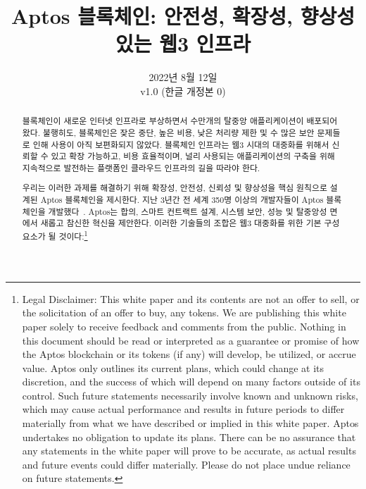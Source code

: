 \documentclass{article}
\title{Aptos 블록체인: 안전성, 확장성, 향상성 있는 웹3 인프라}
\author{}
\date{2022년 8월 12일\\v1.0 (한글 개정본 0)}
\begin{document}
\maketitle

\renewcommand{\abstractname}{초록}
\renewcommand{\figurename}{그림}

\begin{abstract}
블록체인이 새로운 인터넷 인프라로 부상하면서 수만개의 탈중앙 애플리케이션이 배포되어 왔다. 불행히도, 블록체인은 잦은 중단, 높은 비용, 낮은 처리량 제한 및 수 많은 보안 문제들로 인해 사용이 아직 보편화되지 않았다. 블록체인 인프라는 웹3 시대의 대중화를 위해서 신뢰할 수 있고 확장 가능하고, 비용 효율적이며, 널리 사용되는 애플리케이션의 구축을 위해 지속적으로 발전하는 플랫폼인 클라우드 인프라의 길을 따라야 한다.

우리는 이러한 과제를 해결하기 위해 확장성, 안전성, 신뢰성 및 향상성을 핵심 원칙으로 설계된  Aptos 블록체인을 제시한다. 지난 3년간 전 세계 350명 이상의 개발자들이 Aptos 블록체인을 개발했다~\cite{aptos_core_github}. Aptos는 합의, 스마트 컨트랙트 설계, 시스템 보안, 성능 및 탈중앙성 면에서 새롭고 참신한 혁신을 제안한다. 이러한 기술들의 조합은 웹3 대중화를 위한 기본 구성 요소가 될 것이다:\footnote{Legal Disclaimer: This white paper and its contents are not an offer to sell, or the solicitation of an offer to buy, any tokens. We are publishing this white paper solely to receive feedback and comments from the public. Nothing in this document should be read or interpreted as a guarantee or promise of how the Aptos blockchain or its tokens (if any) will develop, be utilized, or accrue value. Aptos only outlines its current plans, which could change at its discretion, and the success of which will depend on many factors outside of its control. Such future statements necessarily involve known and unknown risks, which may cause actual performance and results in future periods to differ materially from what we have described or implied in this white paper. Aptos undertakes no obligation to update its plans. There can be no assurance that any statements in the white paper will prove to be accurate, as actual results and future events could differ materially. Please do not place undue reliance on future statements.}
 

\end{abstract}
\end{document}
